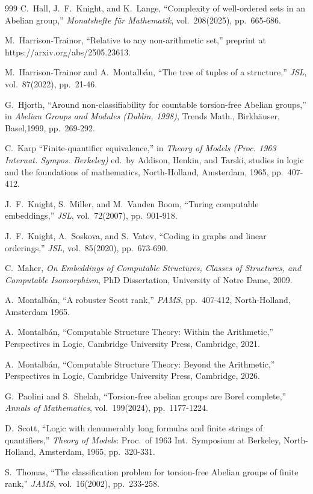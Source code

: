 \documentclass{article}
\begin{document}
\begin{thebibliography}{999}
  C.\ Hall, J.\ F.\ Knight, and K.\ Lange, ``Complexity of well-ordered sets in an Abelian group,'' \emph{Monatshefte f\"{u}r Mathematik}, vol.\ 208(2025), pp.~665-686.

 M.\ Harrison-Trainor, ``Relative to any non-arithmetic set,'' preprint at https://arxiv.org/abs/2505.23613.

  M.\ Harrison-Trainor and A.\ Montalb\'{a}n, ``The tree of tuples of a structure,'' \emph{JSL}, vol.\ 87(2022), pp.\ 21-46.

 G.\ Hjorth, ``Around non-classifiability for countable torsion-free Abelian groups,'' in \emph{Abelian Groups and Modules (Dublin, 1998)}, Trends Math., Birkh\"{a}user, Basel,1999, pp.\ 269-292. 

 C.\ Karp ``Finite-quantifier equivalence,'' in \textit{Theory of Models (Proc. 1963 Internat. Sympos. Berkeley)} ed.\ by Addison, Henkin, and Tarski, studies in logic and the foundations of mathematics, North-Holland, Amsterdam, 1965, pp.\ 407-412.  

 J.\ F.\ Knight, S.\ Miller, and M.\ Vanden Boom, ``Turing computable embeddings,'' \emph{JSL}, vol.\ 72(2007), pp.\ 901-918.

  J.\ F.\ Knight, A.\ Soskova, and S.\ Vatev, ``Coding in graphs and linear orderings,'' \emph{JSL}, vol.\ 85(2020), pp.\ 673-690.

  C.\ Maher, \emph{On Embeddings of Computable Structures, Classes of Structures, and Computable Isomorphism}, PhD Dissertation, University of Notre Dame, 2009.  

  A.\ Montalb\'{a}n, ``A robuster Scott rank,'' \emph{PAMS}, pp.\ 407-412, North-Holland, Amsterdam 1965.

 A.\ Montalbán, ``Computable Structure Theory: Within the Arithmetic,'' Perspectives in Logic,
Cambridge University Press, Cambridge, 2021.

 A.\ Montalbán, ``Computable Structure Theory: Beyond the Arithmetic,'' Perspectives in Logic, Cambridge University Press, Cambridge, 2026.

  G.\ Paolini and S.\ Shelah, ``Torsion-free abelian groups are Borel complete,'' \emph{Annals of Mathematics}, vol.\ 199(2024), pp.\ 1177-1224.

  D.\ Scott, ``Logic with denumerably long formulas and finite strings of quantifiers,'' \emph{Theory of Models}: Proc.\ of 1963 Int.\ Symposium at Berkeley, North-Holland, Amsterdam, 1965, pp.\ 320-331.  

  S.\ Thomas, ``The classification problem for torsion-free Abelian groups of finite rank,'' \emph{JAMS}, vol.\ 16(2002), pp.\ 233-258.








\end{thebibliography}      
\end{document}

